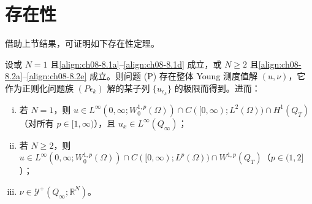 \documentclass[../../main.tex]{subfiles}%
\begin{document}
\section{存在性}\label{section:ch08-存在性}

借助上节结果，可证明如下存在性定理。

\begin{theorem}\label{theorem:ch08-存在性}
设或 $N=1$ 且\eqref{align:ch08-8.1a}--\eqref{align:ch08-8.1d} 成立，或 $N\geqslant2$ 且\eqref{align:ch08-8.2a}--\eqref{align:ch08-8.2e} 成立。则问题 (P) 存在整体 Young 测度值解 $(u,\nu)$，它作为正则化问题族 $(P\epsilon_k)$ 解的某子列 $\{u_{\epsilon_k}\}$ 的极限而得到。进而：
\begin{enumerate}[(i)]
\item\label{item:ch08-exist-i} 若 $N=1$，则 $u\in L^\infty(0,\infty;W^{1,p}_0(\Omega))\cap C([0,\infty);L^2(\Omega))\cap H^1(Q_T)$（对所有 $p\in[1,\infty)$），且 $u_x\in L^\infty(Q_\infty)$；
\item\label{item:ch08-exist-ii} 若 $N\geqslant2$，则 $u\in L^\infty(0,\infty;W^{1,p}_0(\Omega))\cap C([0,\infty);L^p(\Omega))\cap W^{1,p}(Q_T)$（$p\in(1,2]$）；
\item\label{item:ch08-exist-iii} $\nu\in\mathcal{Y}^+(Q_\infty;\mathbb{R}^N)$。
\end{enumerate}
\end{theorem}
\end{document}
